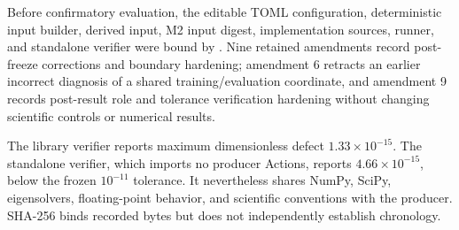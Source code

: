Before confirmatory evaluation, the editable TOML configuration, deterministic
input builder, derived input, M2 input digest, implementation sources, runner,
and standalone verifier were bound by . Nine
retained amendments record post-freeze corrections and boundary hardening;
amendment 6 retracts an earlier incorrect diagnosis of a shared
training/evaluation coordinate, and amendment 9 records post-result role and
tolerance verification hardening without changing scientific controls or
numerical results.

The library verifier reports maximum dimensionless defect
$1.33\times10^{-15}$. The standalone verifier, which imports no producer
Actions, reports $4.66\times10^{-15}$, below the frozen $10^{-11}$ tolerance.
It nevertheless shares NumPy, SciPy, eigensolvers, floating-point behavior, and
scientific conventions with the producer. SHA-256 binds recorded bytes but does
not independently establish chronology.
